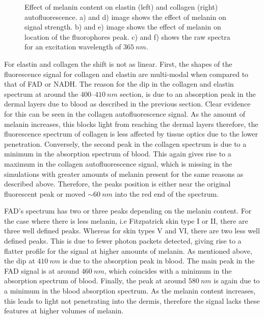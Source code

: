 \begin{figure}[!htbp]
    \centering
    \caption{Effect of melanin content on elastin (left) and collagen (right) autofluorescence. a) and d) image shows the effect of melanin on signal strength. b) and e) image shows the effect of melanin on location of the fluorophores peak. c) and f) shows the raw spectra for an excitation wavelength of $365~nm$.}%
    \label{fig:elscol-mel}%
\end{figure}

For elastin and collagen the shift is not as linear.
First, the shapes of the fluorescence signal for collagen and elastin are multi-modal when compared to that of FAD or NADH\@.
The reason for the dip in the collagen and elastin spectrum at around the $400$--$410~nm$ section, is due to an absorption peak in the dermal layers due to blood as described in the previous section.
Clear evidence for this can be seen in the collagen autofluorescence signal.
As the amount of melanin increases, this blocks light from reaching the dermal layers therefore, the fluorescence spectrum of collagen is less affected by tissue optics due to the lower penetration.
Conversely, the second peak in the collagen spectrum is due to a minimum in the absorption spectrum of blood.
This again gives rise to a maximum in the collagen autofluorescence signal, which is missing in the simulations with greater amounts of melanin present for the same reasons as described above.
Therefore, the peaks position is either near the original fluorescent peak or moved $\sim 60~nm$ into the red end of the spectrum.

FAD's spectrum has two or three peaks depending on the melanin content.
For the case where there is less melanin, i.e Fitzpatrick skin type I or II, there are three well defined peaks.
Whereas for skin types V and VI, there are two less well defined peaks.
This is due to fewer photon packets detected, giving rise to a flatter profile for the signal at higher amounts of melanin.
As mentioned above, the dip at $410~nm$ is due to the absorption peak in blood. 
The main peak in the FAD signal is at around $460~nm$, which coincides with a minimum in the absorption spectrum of blood.
Finally, the peak at around $580~nm$ is again due to a minimum in the blood absorption spectrum.
As the melanin content increases, this leads to light not penetrating into the dermis, therefore the signal lacks these features at higher volumes of melanin.

